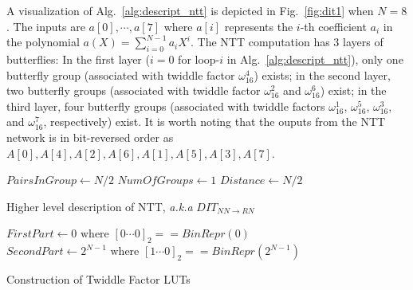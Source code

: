 \documentclass{iacrtrans}
\theoremstyle{plain}
\begin{document}
A visualization of Alg.~\ref{alg:descript_ntt} is depicted in Fig.~\ref{fig:dit1} when $N=8$. The inputs are $a[0],\cdots,a[7]$ where $a[i]$ represents the $i$-th coefficient $a_i$ in the polynomial $a(X)=\sum_{i=0}^{N-1}a_iX^i$. The NTT computation has 3 layers of butterflies: In the first layer ($i=0$ for loop-$i$ in Alg.~\ref{alg:descript_ntt}), only one butterfly group (associated with twiddle factor $\omega_{16}^4$) exists; in the second layer, two butterfly groups (associated with twiddle factor $\omega_{16}^2$ and $\omega_{16}^6$) exist; in the third layer, four butterfly groups (associated with twiddle factors $\omega_{16}^1$, $\omega_{16}^5$, $\omega_{16}^3$, and $\omega_{16}^7$, respectively) exist. It is worth noting that the ouputs from the NTT network is in bit-reversed order as $A[0],A[4],A[2],A[6],A[1],A[5],A[3],A[7]$.

\begin{algorithm}[!tbh]
 \DontPrintSemicolon %
    $PairsInGroup \gets N/2$\;
    $NumOfGroups \gets 1$\;
    $Distance \gets N/2$\;
 \caption{Higher level description of NTT, \textit{a.k.a} $DIT_{NN\to RN}$}\label{alg:descript_ntt}
\end{algorithm}

\begin{algorithm}[!tbh]
 \DontPrintSemicolon %
    $FirstPart \gets 0 \text{ where } [0\cdots0]_2 == BinRepr(0)$\;{}
    $SecondPart \gets 2^{N-1} \text{ where } [1\cdots0]_2 == BinRepr(2^{N-1})$\;
 \caption{Construction of Twiddle Factor LUTs}\label{alg:descript_twiddlefactor}
\end{algorithm}
\end{document}
